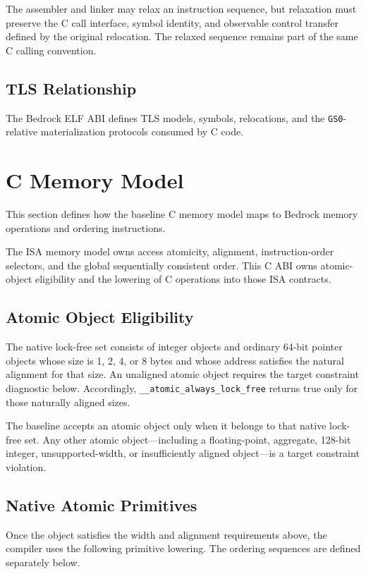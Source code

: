 \documentclass[10pt,twoside]{article}
\begin{document}


The assembler and linker may relax an instruction sequence, but relaxation
must preserve the C call interface, symbol identity, and observable control
transfer defined by the original relocation. The relaxed sequence remains part
of the same C calling convention.

\subsection{TLS Relationship}
The Bedrock ELF ABI defines TLS models, symbols, relocations, and the
\texttt{GS0}-relative materialization protocols consumed by C code.

\section{C Memory Model}\label{page:c-memory-model}
This section defines how the baseline C memory model maps to Bedrock memory
operations and ordering instructions.

The ISA memory model owns access atomicity, alignment, instruction-order
selectors, and the global sequentially consistent order. This C ABI owns
atomic-object eligibility and the lowering of C operations into those ISA
contracts.

\subsection{Atomic Object Eligibility}
The native lock-free set consists of integer objects and ordinary 64-bit
pointer objects whose size is 1, 2, 4, or 8 bytes and whose address satisfies
the natural alignment for that size. An unaligned atomic object requires the
target constraint diagnostic below. Accordingly, \texttt{\_\_atomic\_always\_lock\_free} returns true
only for those naturally aligned sizes.

The baseline accepts an atomic object only when it belongs to that native
lock-free set. Any other atomic object---including a floating-point, aggregate,
128-bit integer, unsupported-width, or insufficiently aligned
object---is a target constraint violation.

\subsection{Native Atomic Primitives}
Once the object satisfies the width and alignment requirements above, the
compiler uses the following primitive lowering. The ordering sequences are
defined separately below.
\end{document}
